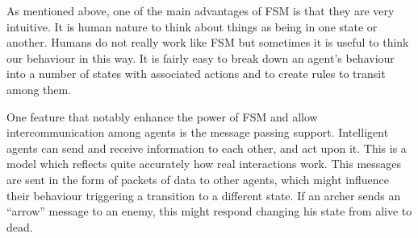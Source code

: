 As mentioned above, one of the main advantages of FSM is that they are very intuitive. It is human nature to think about things as being in one state or another. Humans do not really work like FSM but sometimes it is useful to think our behaviour in this way. It is fairly easy to break down an agent's behaviour into a number of states with associated actions and to create rules to transit among them.

One feature that notably enhance the power of FSM and allow intercommunication among agents is the message passing support. Intelligent agents can send and receive information to each other, and act upon it. This is a model which reflects quite accurately how real interactions work. This messages are sent in the form of packets of data to other agents, which might influence their behaviour triggering a transition to a different state. If an archer sends an ``arrow'' message to an enemy, this might respond changing his state from alive to dead.

\ifx\isEmbedded\undefined


\pagebreak

\fi